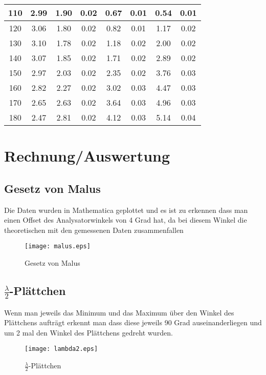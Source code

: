 \documentclass[a4paper]{article}
\begin{document}
\begin{table}[ht]
\begin{tabular}{|c|c|c|c|c|c|c|c|}
    \hline
   110&2.99&1.90&0.02&0.67&0.01&0.54&0.01\\
    \hline
   120&3.06&1.80&0.02&0.82&0.01&1.17&0.02\\
    \hline
   130&3.10&1.78&0.02&1.18&0.02&2.00&0.02\\
    \hline
   140&3.07&1.85&0.02&1.71&0.02&2.89&0.02\\
    \hline
   150&2.97&2.03&0.02&2.35&0.02&3.76&0.03\\
    \hline
   160&2.82&2.27&0.02&3.02&0.03&4.47&0.03\\
    \hline
   170&2.65&2.63&0.02&3.64&0.03&4.96&0.03\\
    \hline
   180&2.47&2.81&0.02&4.12&0.03&5.14&0.04\\
    \hline
  \end{tabular}
  \label{tab:2}
\end{table}
\newpage
\section{Rechnung/Auswertung}
\subsection{Gesetz von Malus}
  Die Daten wurden in Mathematica geplottet und es ist zu erkennen dass man einen Offset des Analysatorwinkels von 4 Grad hat, da bei diesem Winkel die theoretischen mit den gemessenen Daten zusammenfallen

  \begin{figure}[ht]
    \begin{center}
      \texttt{[image: malus.eps]}
    \end{center}
    \caption{Gesetz von Malus}
    \label{fig:1}
  \end{figure}

  \subsection{$\frac{\lambda}{2}$-Plättchen}
  Wenn man jeweils das Minimum und das Maximum über den Winkel des Plättchens aufträgt erkennt man dass diese jeweils 90 Grad auseinanderliegen und um 2 mal den Winkel des Plättchens gedreht wurden.

  \begin{figure}[ht]
    \begin{center}
      \texttt{[image: lambda2.eps]}
    \end{center}
    \caption{$\frac{\lambda}{2}$-Plättchen}
    \label{fig:2}
  \end{figure}
\end{document}
